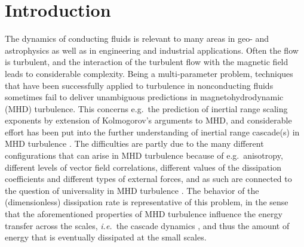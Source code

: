 \documentclass[aps,pre,onecolumn,superscriptaddress,notitlepage]{revtex4-1}
\begin{document}
\section{Introduction}
The dynamics of conducting fluids is relevant to many areas in geo- and astrophysics as well as
in engineering and industrial applications. Often the flow is turbulent, and the 
interaction of the turbulent flow with the magnetic field leads to considerable complexity. 
Being a multi-parameter problem, techniques that have been successfully applied to 
turbulence in nonconducting fluids sometimes fail to deliver unambiguous predictions
in magnetohydrodynamic (MHD) turbulence. This  
concerns e.g.~the prediction of inertial range scaling exponents by extension of 
Kolmogorov's arguments \cite{Kolmogorov41a} to MHD, and considerable effort 
has been put into the further understanding of inertial range cascade(s) in MHD 
turbulence \cite{Iroshnikov64,Kraichnan65a,Goldreich95,Boldyrev05a,Boldyrev06,
Beresnyak06,Mason06,Gogoberidze07}.           
The difficulties are partly due to the many different configurations that can arise
in MHD turbulence because of e.g.~anisotropy, 
different levels of vector field correlations, different 
values of the dissipation coefficients and
different types of external forces, and as such are  
connected to the question of universality in MHD turbulence %
\cite{Dallas13a,Dallas13b,Wan12,Schekochihin08,Mininni11,
Grappin83,Pouquet08,Beresnyak11,Boldyrev11,Grappin10,Lee10,Servidio08}.
The behavior of the (dimensionless) dissipation
rate is representative of this problem, in the sense that the aforementioned properties of MHD turbulence 
influence the energy transfer across the scales, {\em i.e.}~the cascade dynamics 
\cite{Frisch75,Pouquet76,Pouquet78,Biskamp93,Dallas13b,Alexakis13}, and thus the amount of
energy that is eventually dissipated at the small scales.
\end{document}
